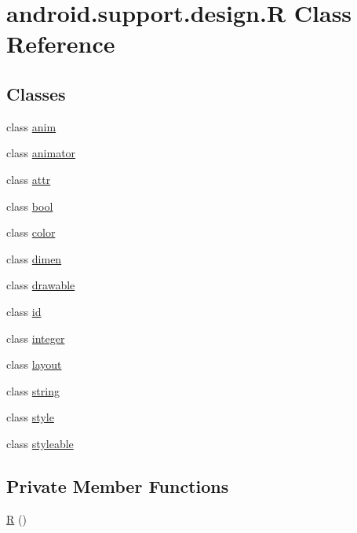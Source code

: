 \hypertarget{classandroid_1_1support_1_1design_1_1_r}{}\section{android.\+support.\+design.\+R Class Reference}
\label{classandroid_1_1support_1_1design_1_1_r}
\subsection*{Classes}
\begin{DoxyCompactItemize}
\item 
class \mbox{\hyperlink{classandroid_1_1support_1_1design_1_1_r_1_1anim}{anim}}
\item 
class \mbox{\hyperlink{classandroid_1_1support_1_1design_1_1_r_1_1animator}{animator}}
\item 
class \mbox{\hyperlink{classandroid_1_1support_1_1design_1_1_r_1_1attr}{attr}}
\item 
class \mbox{\hyperlink{classandroid_1_1support_1_1design_1_1_r_1_1bool}{bool}}
\item 
class \mbox{\hyperlink{classandroid_1_1support_1_1design_1_1_r_1_1color}{color}}
\item 
class \mbox{\hyperlink{classandroid_1_1support_1_1design_1_1_r_1_1dimen}{dimen}}
\item 
class \mbox{\hyperlink{classandroid_1_1support_1_1design_1_1_r_1_1drawable}{drawable}}
\item 
class \mbox{\hyperlink{classandroid_1_1support_1_1design_1_1_r_1_1id}{id}}
\item 
class \mbox{\hyperlink{classandroid_1_1support_1_1design_1_1_r_1_1integer}{integer}}
\item 
class \mbox{\hyperlink{classandroid_1_1support_1_1design_1_1_r_1_1layout}{layout}}
\item 
class \mbox{\hyperlink{classandroid_1_1support_1_1design_1_1_r_1_1string}{string}}
\item 
class \mbox{\hyperlink{classandroid_1_1support_1_1design_1_1_r_1_1style}{style}}
\item 
class \mbox{\hyperlink{classandroid_1_1support_1_1design_1_1_r_1_1styleable}{styleable}}
\end{DoxyCompactItemize}
\subsection*{Private Member Functions}
\begin{DoxyCompactItemize}
\item 
\mbox{\hyperlink{classandroid_1_1support_1_1design_1_1_r_ad1e86357443b87d6815db644f01672a1}{R}} ()
\end{DoxyCompactItemize}


